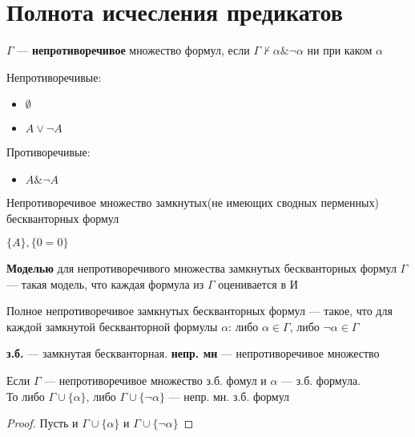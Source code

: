 \documentclass[english]{article}
\begin{document}
\section{Полнота исчесления предикатов}
\label{sec:org07a82a5}
\begin{definition}
	\(\Gamma\) --- \textbf{непротиворечивое} множество формул, если \(\Gamma \not\vdash \alpha \& \neg \alpha\) ни при каком \(\alpha\)
	\label{orgf330a87}
\end{definition}
\begin{examp}
	Непротиворечивые:
	\begin{itemize}
		\item \(\emptyset\)
		\item \(A \vee \neg A\)
	\end{itemize}
	Противоречивые:
	\begin{itemize}
		\item \(A \& \neg A\)
	\end{itemize}
\end{examp}
\begin{remark}
	Непротиворечивое множество замкнутых(не имеющих сводных перменных) бескванторных формул
	\label{orgd47871e}
\end{remark}
\begin{examp}
	\(\{A\}, \{0 = 0\}\)
\end{examp}
\begin{definition}
	\textbf{Моделью} для непротиворечивого множества замкнутых бескванторных формул \(\Gamma\) --- такая модель, что каждая формула из \(\Gamma\) оценивается в И
	\label{orgd4d1b5b}
\end{definition}
\begin{definition}
	Полное непротиворечивое замкнутых бескванторных формул --- такое, что для каждой замкнутой бескванторной формулы \(\alpha\): либо \(\alpha \in \Gamma\), либо \(\neg \alpha \in \Gamma\)
	\label{orgdec66ba}
\end{definition}
\begin{symb}
	\textbf{з.б.} --- замкнутая бескванторная. \textbf{непр. мн} --- непротиворечивое множество
\end{symb}
\begin{theorem}
	Если \(\Gamma\) --- непротиворечивое множество з.б. фомул и \(\alpha\) --- з.б.  формула. \\
	То либо \(\Gamma \cup \{\alpha\}\), либо \(\Gamma \cup \{\neg \alpha\}\) --- непр. мн. з.б. формул
	\label{orge0b58eb}
\end{theorem}
\begin{proof}
	Пусть и \(\Gamma \cup \{\alpha\}\) и \(\Gamma \cup \{\neg \alpha\}\)\todo
\end{proof}
\end{document}
